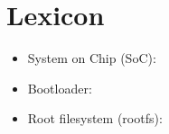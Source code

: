 \chapter*{Lexicon}

\begin{itemize}
\item System on Chip (SoC):
\item Bootloader:
\item Root filesystem (rootfs):
\end{itemize}
